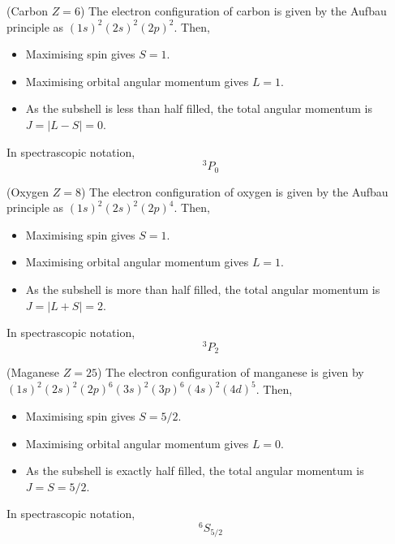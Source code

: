 \begin{ex}
(Carbon $Z=6$) The electron configuration of carbon is given by the Aufbau principle as $(1s)^2(2s)^2(2p)^{2}$. Then,
\begin{itemize}
\item[(i)] Maximising spin gives $S=1$.
\item[(ii)] Maximising orbital angular momentum gives $L=1$.
\item[(iii)] As the subshell is less than half filled, the total angular momentum is $J=|L-S|=0$.
\end{itemize}
In spectrascopic notation, 
\[{}^{3}P_{0}\]
\end{ex}
\vspace{2ex}
\begin{ex}
(Oxygen $Z=8$) The electron configuration of oxygen is given by the Aufbau principle as $(1s)^2(2s)^2(2p)^{4}$. Then,
\begin{itemize}
\item[(i)] Maximising spin gives $S=1$.
\item[(ii)] Maximising orbital angular momentum gives $L=1$.
\item[(iii)] As the subshell is more than half filled, the total angular momentum is $J=|L+S|=2$.
\end{itemize}
In spectrascopic notation,
\[{}^{3}P_{2}\]
\end{ex}
\vspace{2ex}
\begin{ex}
(Maganese $Z=25$) The electron configuration of manganese is given by $(1s)^2(2s)^2(2p)^{6}(3s)^2(3p)^{6}(4s)^2(4d)^{5}$. Then,
\begin{itemize}
\item[(i)] Maximising spin gives $S=5/2$.
\item[(ii)] Maximising orbital angular momentum gives $L=0$.
\item[(iii)] As the subshell is exactly half filled, the total angular momentum is $J=S=5/2$.
\end{itemize}
In spectrascopic notation,
\[{}^{6}S_{5/2}\]
\end{ex}
\vspace{2ex}

